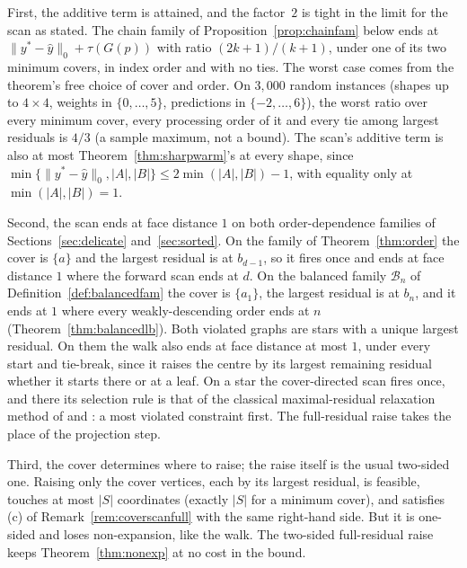 \begin{remark}\label{rem:coverscan}
First, the additive term is attained, and the factor~$2$ is tight in the limit for the scan as
stated. The chain family of Proposition~\ref{prop:chainfam} below ends at
$\|y^* - \hat y\|_0 + \tau(G(p))$ with ratio $(2k+1)/(k+1)$, under one of its two minimum covers,
in index order and with no ties. The worst case comes from the theorem's free choice of cover and
order. On $3{,}000$ random instances (shapes up to $4 \times 4$, weights in $\{0,\dots,5\}$,
predictions in $\{-2,\dots,6\}$), the worst ratio over every minimum cover, every processing order
of it and every tie among largest residuals is $4/3$ (a sample maximum, not a bound). The scan's
additive term is also at most Theorem~\ref{thm:sharpwarm}'s at every shape, since
$\min\{\|y^* - \hat y\|_0, |A|, |B|\} \le 2\min(|A|,|B|) - 1$, with equality only at
$\min(|A|,|B|) = 1$.

Second, the scan ends at face distance $1$ on both order-dependence families of Sections~\ref{sec:delicate}
and~\ref{sec:sorted}. On the family of Theorem~\ref{thm:order} the cover is $\{a\}$ and the largest
residual is at $b_{d-1}$, so it fires once and ends at face distance $1$ where the forward scan
ends at $d$. On the balanced family $\mathcal{B}_n$ of Definition~\ref{def:balancedfam} the cover
is $\{a_1\}$, the largest residual is at $b_n$, and it ends at $1$ where every weakly-descending
order ends at $n$ (Theorem~\ref{thm:balancedlb}). Both violated graphs are stars with a unique
largest residual. On them the walk also ends at face distance at most $1$, under every start and
tie-break, since it raises the centre by its largest remaining residual whether it starts there or
at a leaf. On a star the cover-directed scan fires
once, and there its selection rule is that of the classical maximal-residual relaxation method of
\citet{agmon1954} and \citet{motzkin1954}: a most violated constraint first. The full-residual
raise takes the place of the projection step.

Third, the cover determines where to raise; the raise itself is the usual
two-sided one. Raising only the cover vertices, each by its largest residual, is feasible, touches
at most $|S|$ coordinates (exactly $|S|$ for a minimum cover), and satisfies (c) of
Remark~\ref{rem:coverscanfull} with the same right-hand side. But it is one-sided and loses
non-expansion, like the walk. The two-sided full-residual raise keeps Theorem~\ref{thm:nonexp} at
no cost in the bound.
\end{remark}

